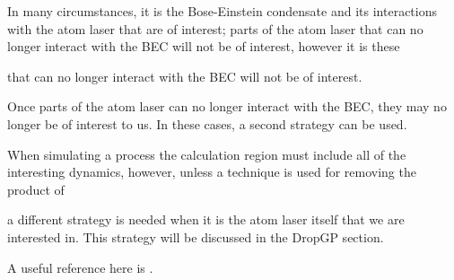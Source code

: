 In many circumstances, it is the Bose-Einstein condensate and its interactions with the atom laser that are of interest; parts of the atom laser that can no longer interact with the BEC will not be of interest, however it is these 

 that can no longer interact with the BEC will not be of interest.

Once parts of the atom laser can no longer interact with the BEC, they may no longer be of interest to us. In these cases, a second strategy can be used.


When simulating a process the calculation region must include all of the interesting dynamics, however, unless a technique is used for removing the product of 

a different strategy is needed when it is the atom laser itself that we are interested in. This strategy will be discussed in the DropGP section.


A useful reference here is \citep{Neuhasuer:1989}.


